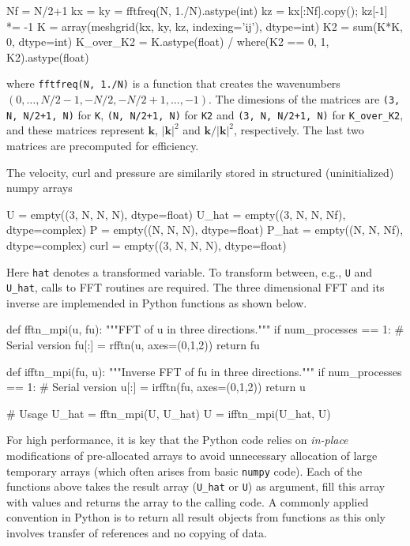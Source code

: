 \documentclass[11pt, oneside]{article}
\newcommand{\inpyth}{\lstinline[style=pythonstyle, basicstyle=\ttfamily]} %[]%
\begin{document}
\begin{python}
Nf = N/2+1
kx = ky = fftfreq(N, 1./N).astype(int)
kz = kx[:Nf].copy(); kz[-1] *= -1
K = array(meshgrid(kx, ky, kz, indexing='ij'), dtype=int)
K2 = sum(K*K, 0, dtype=int)
K_over_K2 = K.astype(float) / where(K2 == 0, 1, K2).astype(float)
\end{python}
where \inpyth{fftfreq(N, 1./N)} is a function that creates the wavenumbers $(0, \ldots, N/2-1, -N/2, -N/2+1, \ldots, -1)$. The dimesions of the matrices are \inpyth{(3, N, N/2+1, N)} for \texttt{K}, \inpyth{(N, N/2+1, N)} for \texttt{K2} and \inpyth{(3, N, N/2+1, N)} for \texttt{K\_over\_K2}, and these matrices represent $\bm{k}$, $|\bm{k}|^2$ and $\bm{k}/|\bm{k}|^2$, respectively. The last two matrices are precomputed for efficiency.

The velocity, curl and pressure are similarily stored in structured (uninitialized) numpy arrays

\begin{python}
U     = empty((3, N, N, N),  dtype=float)
U_hat = empty((3, N, N, Nf), dtype=complex)
P     = empty((N, N, N),     dtype=float)
P_hat = empty((N, N, Nf),    dtype=complex)
curl  = empty((3, N, N, N),  dtype=float)
\end{python}
Here \inpyth{hat} denotes a transformed variable. To transform between, e.g., \inpyth{U} and \inpyth{U_hat}, calls to FFT routines are required. The three dimensional FFT and its inverse are implemended in Python functions as shown below.

\begin{python}
def fftn_mpi(u, fu):
    """FFT of u in three directions."""
    if num_processes == 1:                # Serial version
        fu[:] = rfftn(u, axes=(0,1,2))
    return fu

def ifftn_mpi(fu, u):
    """Inverse FFT of fu in three directions."""
    if num_processes == 1:                # Serial version
        u[:] = irfftn(fu, axes=(0,1,2))
    return u

# Usage
U_hat = fftn_mpi(U, U_hat)
U = ifftn_mpi(U_hat, U)
\end{python}
For high performance, it is key that the Python code relies on \emph{in-place}
modifications of pre-allocated arrays to avoid unnecessary allocation of
large temporary arrays (which often arises from basic \texttt{numpy} code).
Each of the functions above takes the result array (\texttt{U\_hat} or
\texttt{U}) as argument, fill this array with values and returns the
array to the calling code. A commonly applied convention in
Python is to return all result objects from functions as this only involves
transfer of references and no copying of data.
\end{document}
